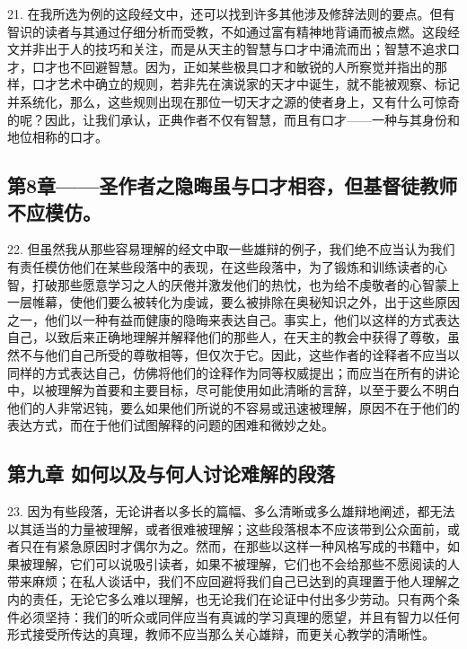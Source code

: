 21. 在我所选为例的这段经文中，还可以找到许多其他涉及修辞法则的要点。但有智识的读者与其通过仔细分析而受教，不如通过富有精神地背诵而被点燃。这段经文并非出于人的技巧和关注，而是从天主的智慧与口才中涌流而出；智慧不追求口才，口才也不回避智慧。因为，正如某些极具口才和敏锐的人所察觉并指出的那样，口才艺术中确立的规则，若非先在演说家的天才中诞生，就不能被观察、标记并系统化，那么，这些规则出现在那位一切天才之源的使者身上，又有什么可惊奇的呢？因此，让我们承认，正典作者不仅有智慧，而且有口才——一种与其身份和地位相称的口才。\par


\subsection{第8章——圣作者之隐晦虽与口才相容，但基督徒教师不应模仿。}

22. 但虽然我从那些容易理解的经文中取一些雄辩的例子，我们绝不应当认为我们有责任模仿他们在某些段落中的表现，在这些段落中，为了锻炼和训练读者的心智，打破那些愿意学习之人的厌倦并激发他们的热忱，也为给不虔敬者的心智蒙上一层帷幕，使他们要么被转化为虔诚，要么被排除在奥秘知识之外，出于这些原因之一，他们以一种有益而健康的隐晦来表达自己。事实上，他们以这样的方式表达自己，以致后来正确地理解并解释他们的那些人，在天主的教会中获得了尊敬，虽然不与他们自己所受的尊敬相等，但仅次于它。因此，这些作者的诠释者不应当以同样的方式表达自己，仿佛将他们的诠释作为同等权威提出；而应当在所有的讲论中，以被理解为首要和主要目标，尽可能使用如此清晰的言辞，以至于要么不明白他们的人非常迟钝，要么如果他们所说的不容易或迅速被理解，原因不在于他们的表达方式，而在于他们试图解释的问题的困难和微妙之处。\par


\subsection{第九章 如何以及与何人讨论难解的段落}

23. 因为有些段落，无论讲者以多长的篇幅、多么清晰或多么雄辩地阐述，都无法以其适当的力量被理解，或者很难被理解；这些段落根本不应该带到公众面前，或者只在有紧急原因时才偶尔为之。然而，在那些以这样一种风格写成的书籍中，如果被理解，它们可以说吸引读者，如果不被理解，它们也不会给那些不愿阅读的人带来麻烦；在私人谈话中，我们不应回避将我们自己已达到的真理置于他人理解之内的责任，无论它多么难以理解，也无论我们在论证中付出多少劳动。只有两个条件必须坚持：我们的听众或同伴应当有真诚的学习真理的愿望，并且有智力以任何形式接受所传达的真理，教师不应当那么关心雄辩，而更关心教学的清晰性。\par

